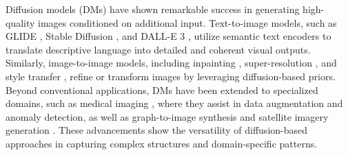 Diffusion models (DMs) have shown remarkable success in generating high-quality images conditioned on additional input. Text-to-image models, such as GLIDE \cite{nichol2021glide}, Stable Diffusion \cite{rombach2022high}, and DALL-E 3 \cite{betker2023improving}, utilize semantic text encoders \cite{radford2021learning} to translate descriptive language into detailed and coherent visual outputs. Similarly, image-to-image models, including inpainting \cite{wang2023imagen,saharia2022palette,tumanyan2023plug}, super-resolution \cite{li2022srdiff,li2022srdiff}, and style transfer \cite{zhang2023inversion}, refine or transform images by leveraging diffusion-based priors.
Beyond conventional applications, DMs have been extended to specialized domains, such as medical imaging \cite{li2023zero}, where they assist in data augmentation and anomaly detection, as well as graph-to-image synthesis \cite{yang2022diffusion} and satellite imagery generation \cite{graikos2024learned}.
These advancements show the versatility of diffusion-based approaches in capturing complex structures and domain-specific patterns.






